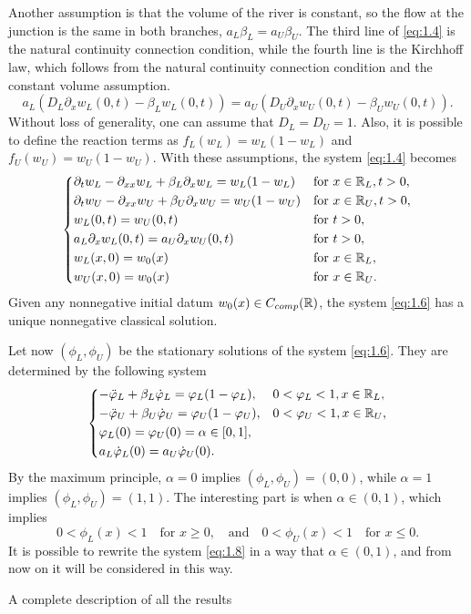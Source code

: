 Another assumption is that the volume of the river is constant, so the flow at the junction is the same in both branches, \(a_L \beta_L = a_U \beta_U\). The third line of \eqref{eq:1.4} is the natural continuity connection condition, while the fourth line is the Kirchhoff law, which follows from the natural continuity connection condition and the constant volume assumption.
\[
    a_L \left(D_L \partial_x w_L(0, t) - \beta_L w_L(0, t)\right) = a_U \left(D_U \partial_x w_U(0, t) - \beta_U w_U(0, t)\right).
\]
Without loss of generality, one can assume that \(D_L = D_U = 1\). Also, it is possible to define the reaction terms as \(f_L(w_L) = w_L(1 - w_L)\) and \(f_U(w_U) = w_U(1 - w_U)\).
With these assumptions, the system \eqref{eq:1.4} becomes
\begin{equation}
    \begin{dcases}
        \partial_t w_L - \partial_{xx}w_L + \beta_L \partial_x w_L = w_L(1 - w_L) & \text{for } x \in \mathbb{R}_L, t > 0, \\
        \partial_t w_U - \partial_{xx}w_U + \beta_U \partial_x w_U = w_U(1 - w_U) & \text{for } x \in \mathbb{R}_U, t > 0, \\
        w_L(0, t) = w_U(0, t) & \text{for } t > 0, \\
        a_L \partial_x w_L(0, t) = a_U \partial_x w_U(0, t) & \text{for } t > 0, \\
        w_L(x, 0) = w_{0}(x) & \text{for } x \in \mathbb{R}_L, \\
        w_U(x, 0) = w_{0}(x) & \text{for } x \in \mathbb{R}_U.
    \end{dcases}
    \label{eq:1.6}
\end{equation}
Given any nonnegative initial datum \(w_0(x) \in C_{comp}(\mathbb{R})\), the system \eqref{eq:1.6} has a unique nonnegative classical solution.

Let now \((\phi_L, \phi_U)\) be the stationary solutions of the system \eqref{eq:1.6}. They are determined by the following system
\begin{equation}
    \begin{dcases}
        - \ddot{\varphi}_L + \beta_L \dot{\varphi}_L = \varphi_L(1 - \varphi_L), & 0 < \varphi_L < 1, x \in \mathbb{R}_L, \\
        - \ddot{\varphi}_U + \beta_U \dot{\varphi}_U = \varphi_U(1 - \varphi_U), & 0 < \varphi_U < 1, x \in \mathbb{R}_U, \\
        \varphi_L(0) = \varphi_U(0) = \alpha \in [0, 1], \\
        a_L \dot{\varphi}_L(0) = a_U \dot{\varphi}_U(0).
    \end{dcases}
    \label{eq:1.8}
\end{equation}
By the maximum principle, \(\alpha = 0\) implies \((\phi_L, \phi_U) = (0, 0)\), while \(\alpha = 1\) implies \((\phi_L, \phi_U) = (1, 1)\). 
The interesting part is when \(\alpha \in (0, 1)\), which implies 
\[
    0 < \phi_L(x) < 1 \quad \text{for } x \geq 0, \quad \text{and} \quad 0 < \phi_U(x) < 1 \quad \text{for } x \leq 0.
\]
It is possible to rewrite the system \eqref{eq:1.8} in a way that \(\alpha \in (0, 1)\), and from now on it will be considered in this way. 

A complete description of all the results